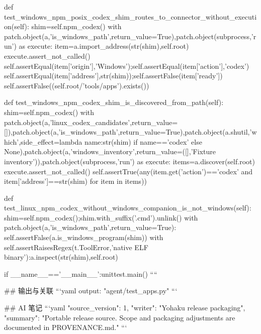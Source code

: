     def test_windows_npm_posix_codex_shim_routes_to_connector_without_execution(self):
        shim=self.npm_codex()
        with patch.object(a,'is_windows_path',return_value=True),patch.object(subprocess,'run') as execute:
            item=a.import_address(str(shim),self.root)
            execute.assert_not_called()
        self.assertEqual(item['origin'],'Windows');self.assertEqual(item['action'],'codex')
        self.assertEqual(item['address'],str(shim));self.assertFalse(item['ready'])
        self.assertFalse((self.root/'tools/apps').exists())

    def test_windows_npm_codex_shim_is_discovered_from_path(self):
        shim=self.npm_codex()
        with patch.object(a,'linux_codex_candidates',return_value=[]),patch.object(a,'is_windows_path',return_value=True),patch.object(a.shutil,'which',side_effect=lambda name:str(shim) if name=='codex' else None),patch.object(a,'windows_inventory',return_value=([],'Fixture inventory')),patch.object(subprocess,'run') as execute:
            items=a.discover(self.root)
            execute.assert_not_called()
        self.assertTrue(any(item.get('action')=='codex' and item['address']==str(shim) for item in items))

    def test_linux_npm_codex_without_windows_companion_is_not_windows(self):
        shim=self.npm_codex();shim.with_suffix('.cmd').unlink()
        with patch.object(a,'is_windows_path',return_value=True):
            self.assertFalse(a.is_windows_program(shim))
            with self.assertRaisesRegex(t.ToolError,'native ELF binary'):a.inspect(str(shim),self.root)

if __name__=='__main__':unittest.main()
````

## 输出与关联
```yaml
output: "agent/test_apps.py"
```

## AI 笔记
```yaml
{"source_version": 1, "writer": "Yohaku release packaging", "summary": "Portable release source. Scope and packaging adjustments are documented in PROVENANCE.md."}
```
